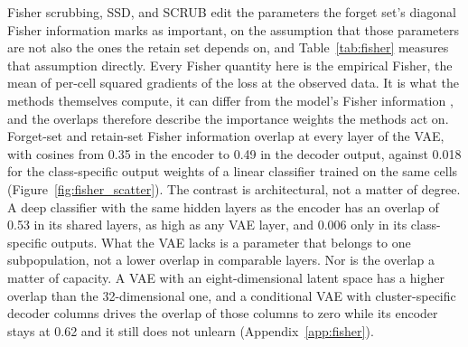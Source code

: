 \documentclass{article}
\begin{document}
Fisher scrubbing, SSD, and SCRUB edit the parameters the forget set's diagonal Fisher information marks as important, on the assumption that those parameters are not also the ones the retain set depends on, and Table~\ref{tab:fisher} measures that assumption directly. Every Fisher quantity here is the empirical Fisher, the mean of per-cell squared gradients of the loss at the observed data. It is what the methods themselves compute, it can differ from the model's Fisher information \citep{kunstner2019}, and the overlaps therefore describe the importance weights the methods act on. Forget-set and retain-set Fisher information overlap at every layer of the VAE, with cosines from 0.35 in the encoder to 0.49 in the decoder output, against 0.018 for the class-specific output weights of a linear classifier trained on the same cells (Figure~\ref{fig:fisher_scatter}). The contrast is architectural, not a matter of degree. A deep classifier with the same hidden layers as the encoder has an overlap of 0.53 in its shared layers, as high as any VAE layer, and 0.006 only in its class-specific outputs. What the VAE lacks is a parameter that belongs to one subpopulation, not a lower overlap in comparable layers. Nor is the overlap a matter of capacity. A VAE with an eight-dimensional latent space has a higher overlap than the 32-dimensional one, and a conditional VAE with cluster-specific decoder columns drives the overlap of those columns to zero while its encoder stays at 0.62 and it still does not unlearn (Appendix~\ref{app:fisher}).

\begin{table}[t]
\centering
\caption{Forget-retain Fisher cosine by parameter group, per-sample diagonal Fisher on PBMC-33k cluster 13 against the retain set, with the classifier and architecture controls. Generated from the NB26 to NB29 and NB35 result files.}
\label{tab:fisher}
\small

\end{table}
\end{document}
